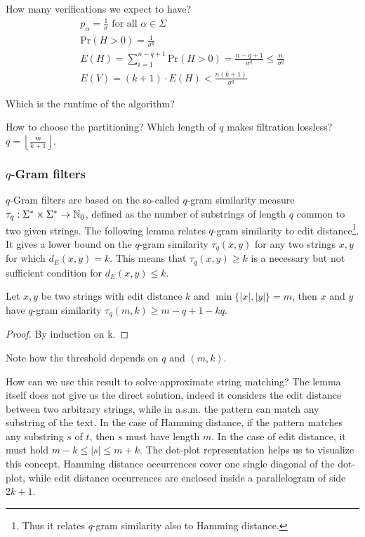 How many verifications we expect to have?
\begin{eqnarray}
p_\alpha = \frac{1}{\sigma} \text{ for all } \alpha \in \Sigma\\
\text{Pr}(H > 0) = \frac{1}{\sigma^q}\\
E(H) = \sum_{i=1}^{n-q+1}{\text{Pr}(H > 0)} = \frac{n - q + 1}{\sigma^q} \leq \frac{n}{\sigma^q}\\
E(V) = (k + 1) \cdot E(H) < \frac{n (k + 1)}{\sigma^q}
\end{eqnarray}

Which is the runtime of the algorithm?

How to choose the partitioning? Which length of $q$ makes filtration lossless?
$q=\left \lfloor \frac{m}{k+1} \right \rfloor$.


\subsubsection{$q$-Gram filters}

$q$-Gram filters are based on the so-called $q$-gram similarity measure $\tau_q : \Sigma^{*} \times \Sigma^{*} \rightarrow \mathbb {N}_0$, defined as the number of substrings of length $q$ common to two given strings.
The following lemma relates $q$-gram similarity to edit distance\footnote{Thus it relates $q$-gram similarity also to Hamming distance.}.
It gives a lower bound on the $q$-gram similarity $\tau_q(x,y)$ for any two strings $x,y$ for which $d_E(x,y) = k$.
This means that $\tau_q(x,y) \geq k$ is a necessary but not sufficient condition for $d_E(x,y) \leq k$.
\begin{lemma}
\label{lemma:qgrams}
\citep{?}
Let $x,y$ be two strings with edit distance $k$ and $\min\{|x|,|y|\} = m$, then $x$ and $y$ have $q$-gram similarity $\tau_q(m,k) \geq m - q + 1 - kq$.
\end{lemma}
\begin{proof}
By induction on k.
\end{proof}

Note how the threshold depends on $q$ and $(m,k)$.

How can we use this result to solve approximate string matching?
The lemma itself does not give us the direct solution, indeed it considers the edit distance between two arbitrary strings, while in a.s.m. the pattern can match any substring of the text.
In the case of Hamming distance, if the pattern matches any substring $s$ of $t$, then $s$ must have length $m$.
In the case of edit distance, it must hold $m - k \leq |s| \leq m + k$.
The dot-plot representation helps us to visualize this concept.
Hamming distance occurrences cover one single diagonal of the dot-plot, while edit distance occurrences are enclosed inside a parallelogram of side $2k+1$.

